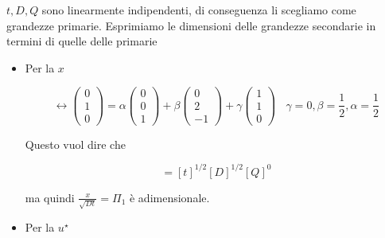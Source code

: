 $t,D,Q$ sono linearmente indipendenti, di conseguenza li scegliamo come grandezze primarie. Esprimiamo le dimensioni delle grandezze secondarie in termini di quelle delle primarie
\begin{itemize}
    \item Per la $x$

          \begin{equation*}
              [ x] \leftrightarrow \begin{pmatrix}
                  0 \\
                  1 \\
                  0
              \end{pmatrix} =\alpha \begin{pmatrix}
                  0 \\
                  0 \\
                  1
              \end{pmatrix} +\beta \begin{pmatrix}
                  0 \\
                  2 \\
                  -1
              \end{pmatrix} +\gamma \begin{pmatrix}
                  1 \\
                  1 \\
                  0
              \end{pmatrix} \ \ \ \ \gamma =0,\beta =\frac{1}{2},\alpha =\frac{1}{2}
          \end{equation*}

          Questo vuol dire che

          \begin{equation*}
              [ x] =[ t]^{1/2}[ D]^{1/2}[ Q]^{0}
          \end{equation*}

          ma quindi $\frac{x}{\sqrt{Dt}} =\Pi _{1}$ è adimensionale.
    \item Per la $u^{\star }$


\end{itemize}
